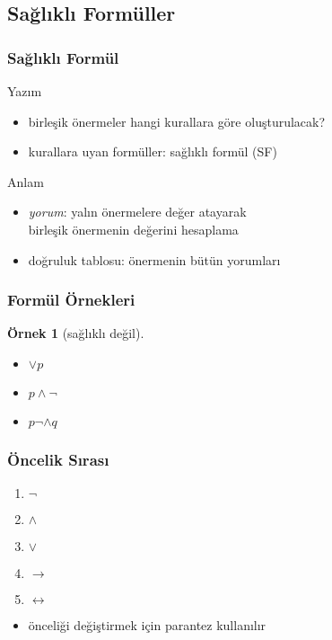 \documentclass[dvipsnames]{beamer}
\theoremstyle{definition}
\theoremstyle{example}
\newtheorem{ornek}[theorem]{Örnek}
\theoremstyle{plain}
\begin{document}
\subsection{Sağlıklı Formüller}

\begin{frame}
  \frametitle{Sağlıklı Formül}

  \begin{block}{Yazım}
    \begin{itemize}
      \item birleşik önermeler hangi kurallara göre oluşturulacak?
      \item kurallara uyan formüller: \alert{sağlıklı formül} (SF)
    \end{itemize}
  \end{block}

  \pause
  \begin{block}{Anlam}
    \begin{itemize}
      \item \emph{yorum}: yalın önermelere değer atayarak\\
        birleşik önermenin değerini hesaplama
      \item doğruluk tablosu: önermenin bütün yorumları
    \end{itemize}
  \end{block}
\end{frame}

\begin{frame}
  \frametitle{Formül Örnekleri}

  \begin{ornek}[sağlıklı değil]
    \begin{itemize}
      \item $\vee p$
      \item $p \wedge \neg$
      \item $p \neg \wedge q$
    \end{itemize}
  \end{ornek}
\end{frame}

\begin{frame}
  \frametitle{Öncelik Sırası}

  \begin{enumerate}
    \item $\neg$
    \item $\wedge$
    \item $\vee$
    \item $\rightarrow$
    \item $\leftrightarrow$
  \end{enumerate}

  \begin{itemize}
    \item önceliği değiştirmek için parantez kullanılır
  \end{itemize}
\end{frame}
\end{document}
